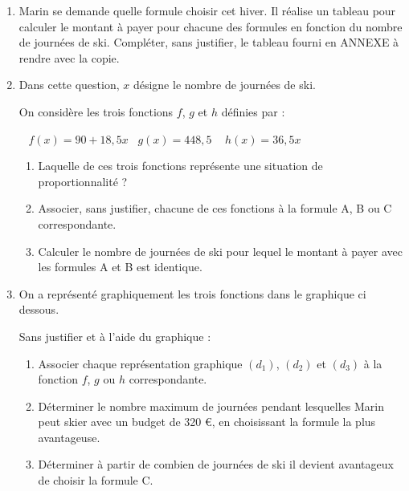 \documentclass[exercice,a4]{thedocument}%
\begin{document}
\begin{enumerate}
	\item Marin se demande quelle formule choisir cet hiver. Il réalise un tableau pour calculer le montant à payer pour chacune des formules en fonction du nombre de journées de ski. Compléter, sans justifier, le tableau fourni en ANNEXE à rendre avec la copie.

	\item Dans cette question, $x$ désigne le nombre de journées de ski.

	On considère les trois fonctions $f$, $g$ et $h$ définies par :

	\hfill~ $f(x) = 90 + 18,5x$\hfill~ $g(x) = 448,5$ \hfill~ $	h(x) = 36,5x$\hfill~

	\begin{enumerate}
		\item Laquelle de ces trois fonctions représente une situation de proportionnalité ?

		\item Associer, sans justifier, chacune de ces fonctions à la formule A, B ou C correspondante.

		\item Calculer le nombre de journées de ski pour lequel le montant à payer avec les formules A et B est identique.
	\end{enumerate}

	\item On a représenté graphiquement les trois fonctions dans le graphique ci dessous.

	Sans justifier et à l'aide du graphique :

	\begin{enumerate}
		\item Associer chaque représentation graphique $(d_1)$, $(d_2)$ et $(d_3)$ à la fonction $f$, $g$ ou $h$ correspondante.

		\item Déterminer le nombre maximum de journées pendant lesquelles Marin peut skier avec un budget de 320 \euro{}, en choisissant la formule la plus avantageuse.

		\item Déterminer à partir de combien de journées de ski il devient avantageux de choisir la formule C.
	\end{enumerate}
\end{enumerate}
\end{document}
